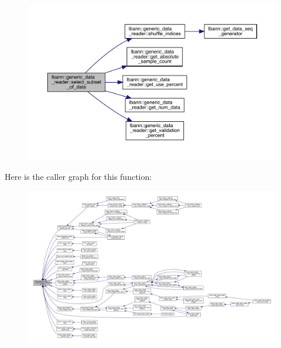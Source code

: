 \begin{figure}[H]
\begin{center}
\leavevmode
\includegraphics[width=350pt]{classlbann_1_1generic__data__reader_aa28fdeeb6af492540f507e49adff5d6c_cgraph}
\end{center}
\end{figure}
Here is the caller graph for this function\+:\nopagebreak
\begin{figure}[H]
\begin{center}
\leavevmode
\includegraphics[width=350pt]{classlbann_1_1generic__data__reader_aa28fdeeb6af492540f507e49adff5d6c_icgraph}
\end{center}
\end{figure}
\mbox{\label{classlbann_1_1generic__data__reader_aa2d83c4ffc58534e0c193b6b9f9fb925}} 
